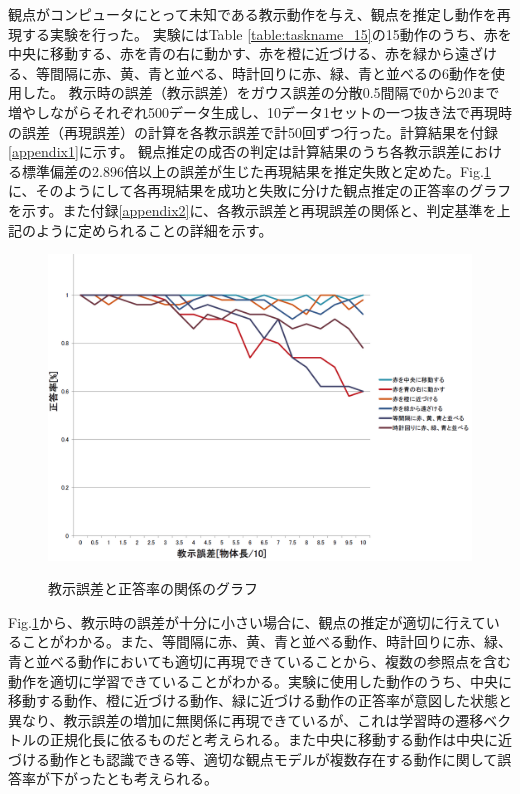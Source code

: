 観点がコンピュータにとって未知である教示動作を与え、観点を推定し動作を再現する実験を行った。
実験にはTable \ref{table:taskname_15}の15動作のうち、赤を中央に移動する、赤を青の右に動かす、赤を橙に近づける、赤を緑から遠ざける、等間隔に赤、黄、青と並べる、時計回りに赤、緑、青と並べるの6動作を使用した。
教示時の誤差（教示誤差）をガウス誤差の分散0.5間隔で0から20まで増やしながらそれぞれ500データ生成し、10データ1セットの一つ抜き法で再現時の誤差（再現誤差）の計算を各教示誤差で計50回ずつ行った。計算結果を付録\ref{appendix1}に示す。
観点推定の成否の判定は計算結果のうち各教示誤差における標準偏差の2.896倍以上の誤差が生じた再現結果を推定失敗と定めた。Fig.\ref{figure:success_rate}に、そのようにして各再現結果を成功と失敗に分けた観点推定の正答率のグラフを示す。また付録\ref{appendix2}に、各教示誤差と再現誤差の関係と、判定基準を上記のように定められることの詳細を示す。
	\begin{figure}[h]
		\begin{center}
			\includegraphics[width=14cm]{chart2.png} \\ %
			\caption{教示誤差と正答率の関係のグラフ}
			\label{figure:success_rate}
		\end{center}
	\end{figure}

Fig.\ref{figure:success_rate}から、教示時の誤差が十分に小さい場合に、観点の推定が適切に行えていることがわかる。また、等間隔に赤、黄、青と並べる動作、時計回りに赤、緑、青と並べる動作においても適切に再現できていることから、複数の参照点を含む動作を適切に学習できていることがわかる。実験に使用した動作のうち、中央に移動する動作、橙に近づける動作、緑に近づける動作の正答率が意図した状態と異なり、教示誤差の増加に無関係に再現できているが、これは学習時の遷移ベクトルの正規化長に依るものだと考えられる。また中央に移動する動作は中央に近づける動作とも認識できる等、適切な観点モデルが複数存在する動作に関して誤答率が下がったとも考えられる。




